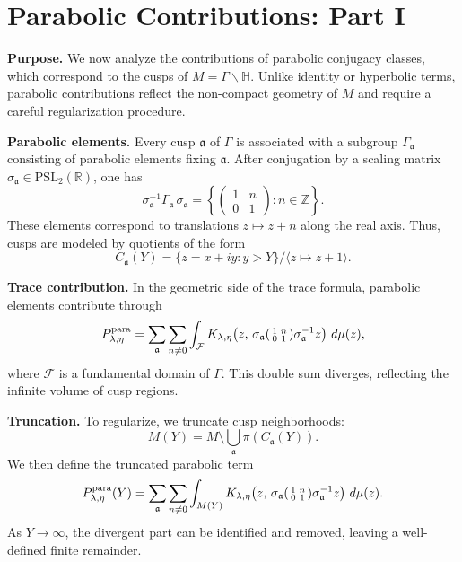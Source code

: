 \section{Parabolic Contributions: Part I}

\noindent\textbf{Purpose.}
We now analyze the contributions of parabolic conjugacy classes,  
which correspond to the cusps of $M=\Gamma\backslash\mathbb{H}$.  
Unlike identity or hyperbolic terms, parabolic contributions reflect the non-compact geometry of $M$  
and require a careful regularization procedure.

\medskip

\noindent\textbf{Parabolic elements.}
Every cusp $\mathfrak{a}$ of $\Gamma$ is associated with a subgroup $\Gamma_\mathfrak{a}$ consisting of parabolic elements fixing $\mathfrak{a}$.  
After conjugation by a scaling matrix $\sigma_\mathfrak{a}\in \mathrm{PSL}_2(\mathbb{R})$, one has
\[
  \sigma_\mathfrak{a}^{-1} \Gamma_\mathfrak{a}\, \sigma_\mathfrak{a}
  = \left\{ \begin{pmatrix} 1 & n \\ 0 & 1 \end{pmatrix} : n\in\mathbb{Z} \right\}.
\]
These elements correspond to translations $z\mapsto z+n$ along the real axis.  
Thus, cusps are modeled by quotients of the form
\[
  C_\mathfrak{a}(Y) = \{ z=x+iy : y>Y\}/\langle z\mapsto z+1\rangle.
\]

\medskip

\noindent\textbf{Trace contribution.}
In the geometric side of the trace formula, parabolic elements contribute through
\[
  P_{\lambda,\eta}^{\mathrm{para}}
  = \sum_{\mathfrak{a}} \sum_{n\neq 0} \int_\mathcal{F}
  K_{\lambda,\eta}\!\left(z,\,
  \sigma_\mathfrak{a}
  \begin{psmallmatrix} 1 & n \\ 0 & 1 \end{psmallmatrix}
  \sigma_\mathfrak{a}^{-1}z\right)\, d\mu(z),
\]
where $\mathcal{F}$ is a fundamental domain of $\Gamma$.  
This double sum diverges, reflecting the infinite volume of cusp regions.

\medskip

\noindent\textbf{Truncation.}
To regularize, we truncate cusp neighborhoods:  
\[
  M(Y) = M \setminus \bigcup_\mathfrak{a} \pi(C_\mathfrak{a}(Y)).
\]
We then define the truncated parabolic term
\[
  P_{\lambda,\eta}^{\mathrm{para}}(Y)
  = \sum_{\mathfrak{a}} \sum_{n\neq 0} \int_{M(Y)}
  K_{\lambda,\eta}\!\left(z,\,
  \sigma_\mathfrak{a}
  \begin{psmallmatrix} 1 & n \\ 0 & 1 \end{psmallmatrix}
  \sigma_\mathfrak{a}^{-1}z\right)\, d\mu(z).
\]
As $Y\to\infty$, the divergent part can be identified and removed,  
leaving a well-defined finite remainder.

